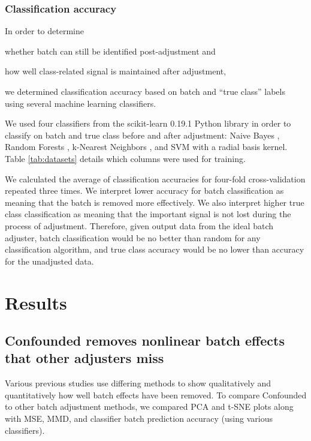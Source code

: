 \documentclass[notitlepage]{article}
\begin{document}
\subsubsection{Classification accuracy}

In order to determine \begin{enumerate*}[(a)]
	\item whether batch can still be identified post-adjustment and
	\item how well class-related signal is maintained after adjustment,
\end{enumerate*}
we determined classification accuracy based on batch and ``true class'' labels using several machine learning classifiers.

We used four classifiers from the scikit-learn 0.19.1 Python library \cite{pedregosa_scikit-learn_2011} in order to classify on batch and true class before and after adjustment: Naive Bayes \citep{maron_automatic_1961}, Random Forests \citep{tin_kam_ho_random_1995}, k-Nearest Neighbors \citep{fix_discriminatory_1951}, and SVM \citep{cortes_support-vector_1995} with a radial basis kernel.
Table \ref{tab:datasets} details which columns were used for training.

We calculated the average of classification accuracies for four-fold cross-validation repeated three times.
We interpret lower accuracy for batch classification as meaning that the batch is removed more effectively.
We also interpret higher true class classification as meaning that the important signal is not lost during the process of adjustment.
Therefore, given output data from the ideal batch adjuster, batch classification would be no better than random for any classification algorithm, and true class accuracy would be no lower than accuracy for the unadjusted data.

\section{Results} \label{sec:results}

\subsection{Confounded removes nonlinear batch effects that other adjusters miss}

Various previous studies use differing methods to show qualitatively and quantitatively how well batch effects have been removed.
To compare Confounded to other batch adjustment methods, we compared PCA and t-SNE plots along with MSE, MMD, and classifier batch prediction accuracy (using various classifiers).
\end{document}
